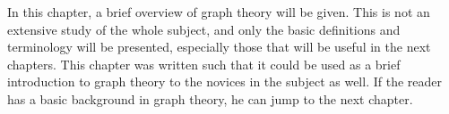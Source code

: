 \label{graph_theory_chapter}
\theoremstyle{plain}
\newtheorem{thm}{Theorem}[chapter] %
\newtheorem{corollary}{Corollary}[thm]
\newtheorem{lemma}[thm]{Lemma}
\theoremstyle{definition}
\newtheorem{defn}[thm]{Definition}

In this chapter, a brief overview of graph theory will be given. This is not an extensive study of the whole subject, and only the basic definitions and terminology will be presented, especially those that will be useful in the next chapters. This chapter was written such that it could be used as a brief introduction to graph theory to the novices in the subject as well. If the reader has a basic background in graph theory, he can jump to the next chapter.\\




